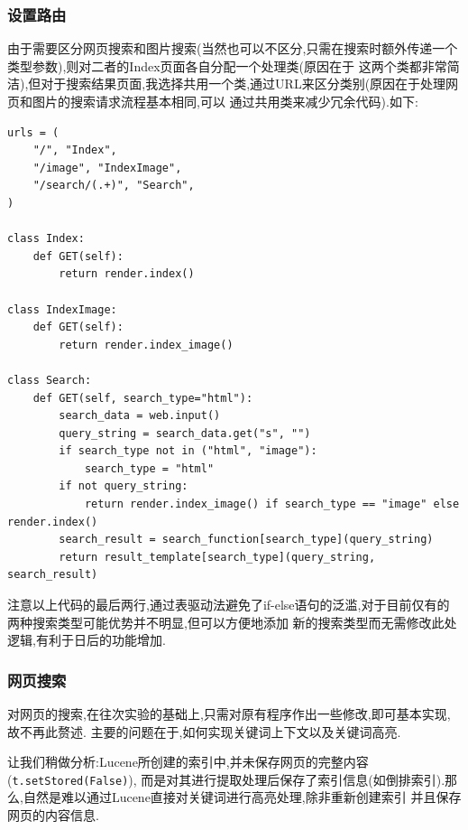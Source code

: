 \documentclass[a4paper]{article}
\begin{document}
            \subsubsection{设置路由}
由于需要区分网页搜索和图片搜索(当然也可以不区分,只需在搜索时额外传递一个类型参数),则对二者的Index页面各自分配一个处理类(原因在于
这两个类都非常简洁),但对于搜索结果页面,我选择共用一个类,通过URL来区分类别(原因在于处理网页和图片的搜索请求流程基本相同,可以
通过共用类来减少冗余代码).如下:
\begin{verbatim}
urls = (
    "/", "Index",
    "/image", "IndexImage",
    "/search/(.+)", "Search",
)

class Index:
    def GET(self):
        return render.index()

class IndexImage:
    def GET(self):
        return render.index_image()

class Search:
    def GET(self, search_type="html"):
        search_data = web.input()
        query_string = search_data.get("s", "")
        if search_type not in ("html", "image"):
            search_type = "html"
        if not query_string:
            return render.index_image() if search_type == "image" else render.index()
        search_result = search_function[search_type](query_string)
        return result_template[search_type](query_string, search_result)
\end{verbatim}

注意以上代码的最后两行,通过表驱动法避免了if-else语句的泛滥,对于目前仅有的两种搜索类型可能优势并不明显,但可以方便地添加
新的搜索类型而无需修改此处逻辑,有利于日后的功能增加.
        \subsubsection{网页搜索}
对网页的搜索,在往次实验的基础上,只需对原有程序作出一些修改,即可基本实现,故不再此赘述.
主要的问题在于,如何实现关键词上下文以及关键词高亮.

让我们稍做分析:Lucene所创建的索引中,并未保存网页的完整内容(\texttt{t.setStored(False)}),
而是对其进行提取处理后保存了索引信息(如倒排索引).那么,自然是难以通过Lucene直接对关键词进行高亮处理,除非重新创建索引
并且保存网页的内容信息.
\end{document}

